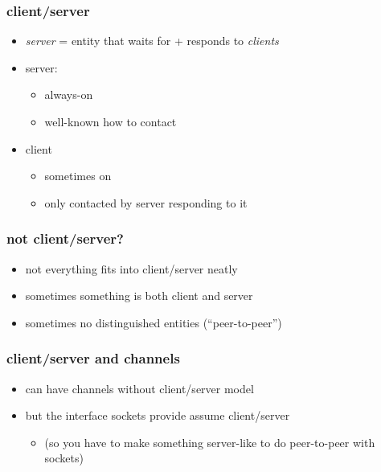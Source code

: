 \begin{frame}\frametitle{client/server}
    \begin{itemize}
    \item \textit{server} = entity that waits for + responds to \textit{clients}
    \item server:
        \begin{itemize}
        \item always-on
        \item well-known how to contact
        \end{itemize}
    \item client
        \begin{itemize}
        \item sometimes on
        \item only contacted by server responding to it
        \end{itemize}
    \end{itemize}
\end{frame}

\begin{frame}\frametitle{not client/server?}
    \begin{itemize}
    \item not everything fits into client/server neatly
    \vspace{.5cm}
    \item sometimes something is both client and server
    \item sometimes no distinguished entities (``peer-to-peer'')
    \end{itemize}
\end{frame}

\begin{frame}\frametitle{client/server and channels}
    \begin{itemize}
    \item can have channels without client/server model
    \vspace{.5cm}
    \item but the interface sockets provide assume client/server
        \begin{itemize}
        \item (so you have to make something server-like to do peer-to-peer with sockets)
        \end{itemize}
    \end{itemize}
\end{frame}
